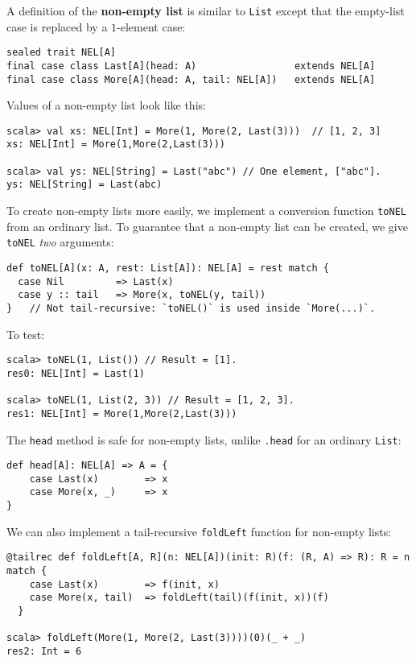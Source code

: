 A definition of the \textbf{non-empty list}
is similar to \lstinline!List! except that the empty-list case is
replaced by a $1$-element case:
\begin{lstlisting}
sealed trait NEL[A]
final case class Last[A](head: A)                 extends NEL[A]
final case class More[A](head: A, tail: NEL[A])   extends NEL[A]
\end{lstlisting}
Values of a non-empty list look like this:
\begin{lstlisting}
scala> val xs: NEL[Int] = More(1, More(2, Last(3)))  // [1, 2, 3]
xs: NEL[Int] = More(1,More(2,Last(3)))

scala> val ys: NEL[String] = Last("abc") // One element, ["abc"].
ys: NEL[String] = Last(abc)
\end{lstlisting}
To create non-empty lists more easily, we implement a conversion function
\lstinline!toNEL! from an ordinary list. To guarantee that a non-empty
list can be created, we give \lstinline!toNEL! \emph{two} arguments:
\begin{lstlisting}
def toNEL[A](x: A, rest: List[A]): NEL[A] = rest match {
  case Nil         => Last(x)
  case y :: tail   => More(x, toNEL(y, tail))
}   // Not tail-recursive: `toNEL()` is used inside `More(...)`.
\end{lstlisting}
To test:
\begin{lstlisting}
scala> toNEL(1, List()) // Result = [1].
res0: NEL[Int] = Last(1)

scala> toNEL(1, List(2, 3)) // Result = [1, 2, 3].
res1: NEL[Int] = More(1,More(2,Last(3)))
\end{lstlisting}

The \lstinline!head! method is safe for non-empty lists, unlike \lstinline!.head!
for an ordinary \lstinline!List!:
\begin{lstlisting}
def head[A]: NEL[A] => A = {
    case Last(x)        => x
    case More(x, _)     => x
}
\end{lstlisting}

We can also implement a tail-recursive \lstinline!foldLeft! function
for non-empty lists:
\begin{lstlisting}
@tailrec def foldLeft[A, R](n: NEL[A])(init: R)(f: (R, A) => R): R = n match {
    case Last(x)        => f(init, x)
    case More(x, tail)  => foldLeft(tail)(f(init, x))(f)
  }

scala> foldLeft(More(1, More(2, Last(3))))(0)(_ + _)
res2: Int = 6
\end{lstlisting}


